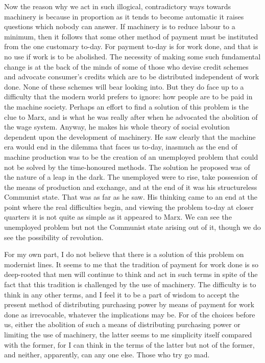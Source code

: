 \documentclass{book}
\begin{document}
Now the reason why we act in such illogical, contradictory ways towards machinery is because in proportion as it tends to become automatic it raises questions which nobody can answer. If machinery is to reduce labour to a minimum, then it follows that some other method of payment must be instituted from the one customary to-day. For payment to-day is for work done, and that is no use if work is to be abolished. The necessity of making some such fundamental change is at the back of the minds of some of those who devise credit schemes and advocate consumer’s credits which are to be distributed independent of work done. None of these schemes will bear looking into. But they do face up to a difficulty that the modern world prefers to ignore: how people are to be paid in the machine society. Perhaps an effort to find a solution of this problem is the clue to Marx, and is what he was really after when he advocated the abolition of the wage system. Anyway, he makes his whole theory of social evolution dependent upon the development of machinery. He saw clearly that the machine era would end in the dilemma that faces us to-day, inasmuch as the end of machine production was to be the creation of an unemployed problem that could not be solved by the time-honoured methods. The solution he proposed was of the nature of a leap in the dark. The unemployed were to rise, take possession of the means of production and exchange, and at the end of it was his structureless Communist state. That was as far as he saw. His thinking came to an end at the point where the real difficulties begin, and viewing the problem to-day at closer quarters it is not quite as simple as it appeared to Marx. We can see the unemployed problem but not the Communist state arising out of it, though we do see the possibility of revolution.

For my own part, I do not believe that there is a solution of this problem on modernist lines. It seems to me that the tradition of payment for work done is so deep-rooted that men will continue to think and act in such terms in spite of the fact that this tradition is challenged by the use of machinery. The difficulty is to think in any other terms, and I feel it to be a part of wisdom to accept the present method of distributing purchasing power by means of payment for work done as irrevocable, whatever the implications may be. For of the choices before us, either the abolition of such a means of distributing purchasing power or limiting the use of machinery, the latter seems to me simplicity itself compared with the former, for I can think in the terms of the latter but not of the former, and neither, apparently, can any one else. Those who try go mad.
\end{document}
